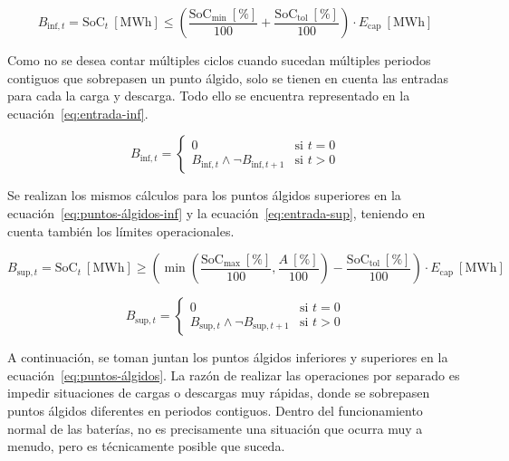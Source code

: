 \begin{equation}
  \label{eq:puntos-álgidos-inf}
  B_{\text{inf}, t} = \mathrm{SoC}_{t}~[\text{MWh}] \le \left( \frac{\mathrm{SoC}_{\text{min}}~[\text{\%}]}{100} + \frac{\mathrm{SoC}_{\text{tol}}~[\text{\%}]}{100} \right) \cdot E_{\text{cap}}~[\text{MWh}]
\end{equation}

Como no se desea contar múltiples ciclos cuando sucedan múltiples periodos contiguos que sobrepasen un punto álgido, solo se tienen en cuenta las entradas para cada la carga y descarga. Todo ello se encuentra representado en la ecuación~\ref{eq:entrada-inf}.

\begin{equation}
  \label{eq:entrada-inf}
  B_{\text{inf}, t} =
  \begin{cases}
    0                                                & \text{si } t = 0\\
    B_{\text{inf}, t} \land \neg B_{\text{inf}, t+1} & \text{si } t > 0
  \end{cases}
\end{equation}

Se realizan los mismos cálculos para los puntos álgidos superiores en la ecuación~\ref{eq:puntos-álgidos-inf} y la ecuación~\ref{eq:entrada-sup}, teniendo en cuenta también los límites operacionales.

\begin{equation}
  \label{eq:puntos-álgidos-sup}
  B_{\text{sup}, t} = \mathrm{SoC}_{t}~[\text{MWh}] \ge \left( \min\left(\frac{\mathrm{SoC}_{\text{max}}~[\text{\%}]}{100}, \frac{A~[\text{\%}]}{100}\right) - \frac{\mathrm{SoC}_{\text{tol}}~[\text{\%}]}{100} \right) \cdot E_{\text{cap}}~[\text{MWh}]
\end{equation}

\begin{equation}
  \label{eq:entrada-sup}
  B_{\text{sup}, t} =
  \begin{cases}
    0                                                & \text{si } t = 0\\
    B_{\text{sup}, t} \land \neg B_{\text{sup}, t+1} & \text{si } t > 0
  \end{cases}
\end{equation}

A continuación, se toman juntan los puntos álgidos inferiores y superiores en la ecuación~\ref{eq:puntos-álgidos}. La razón de realizar las operaciones por separado es impedir situaciones de cargas o descargas muy rápidas, donde se sobrepasen puntos álgidos diferentes en periodos contiguos. Dentro del funcionamiento normal de las baterías, no es precisamente una situación que ocurra muy a menudo, pero es técnicamente posible que suceda.

